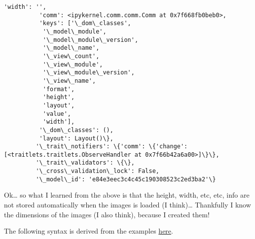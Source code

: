 \documentclass[11pt]{article}
\begin{document}
\begin{Verbatim}[commandchars=\\\{\}]
          'width': '',
          'comm': <ipykernel.comm.comm.Comm at 0x7f668fb0beb0>,
          'keys': ['\_dom\_classes',
           '\_model\_module',
           '\_model\_module\_version',
           '\_model\_name',
           '\_view\_count',
           '\_view\_module',
           '\_view\_module\_version',
           '\_view\_name',
           'format',
           'height',
           'layout',
           'value',
           'width'],
          '\_dom\_classes': (),
          'layout': Layout()\},
         '\_trait\_notifiers': \{'comm': \{'change': [<traitlets.traitlets.ObserveHandler at 0x7f66b42a6a00>]\}\},
         '\_trait\_validators': \{\},
         '\_cross\_validation\_lock': False,
         '\_model\_id': 'e84e3eec3c4c45c190308523c2ed3ba2'\}
\end{Verbatim}
            
    Ok\ldots{} so what I learned from the above is that the height, width,
etc, etc, info are not stored automatically when the images is loaded (I
think)\ldots{} Thankfully I know the dimensions of the images (I also
think), because I created them!

The following syntax is derived from the examples
\href{https://ipycanvas.readthedocs.io/en/latest/drawing_images.html}{here}.
\end{document}
